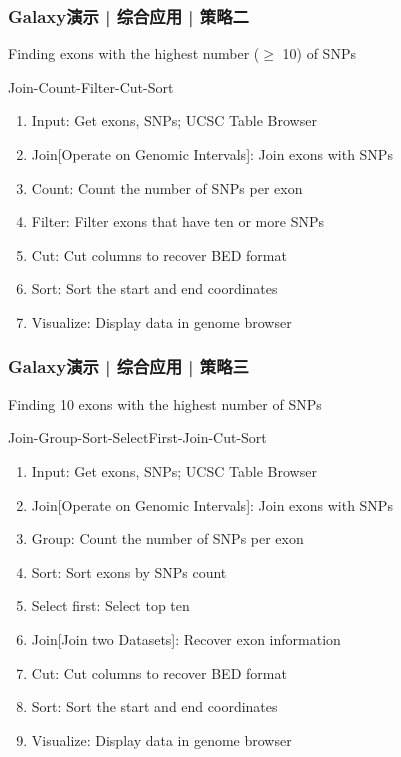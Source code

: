 \begin{frame}
  \frametitle{Galaxy演示 | \alert{综合应用} | 策略二}
  \begin{block}{Finding exons with the highest number ($\geq$ 10) of SNPs}
    \pause
    \begin{block}{Join-Count-Filter-Cut-Sort}
    \pause
  \begin{enumerate}[<+-|alert@+>]
    \item Input: Get exons, SNPs; UCSC Table Browser
    \item Join[Operate on Genomic Intervals]: Join exons with SNPs
    \item Count: Count the number of SNPs per exon 
    \item Filter: Filter exons that have ten or more SNPs
    \item Cut: Cut columns to recover BED format
    \item Sort: Sort the start and end coordinates
    \item Visualize: Display data in genome browser
  \end{enumerate}
\end{block}
  \end{block}
\end{frame}

\begin{frame}
  \frametitle{Galaxy演示 | \alert{综合应用} | 策略三}
  \begin{block}{Finding 10 exons with the highest number of SNPs}
    \pause
    \begin{block}{Join-Group-Sort-SelectFirst-Join-Cut-Sort}
    \pause
  \begin{enumerate}[<+-|alert@+>]
    \item Input: Get exons, SNPs; UCSC Table Browser
    \item Join[Operate on Genomic Intervals]: Join exons with SNPs
    \item Group: Count the number of SNPs per exon 
    \item Sort: Sort exons by SNPs count
    \item Select first: Select top ten
    \item Join[Join two Datasets]: Recover exon information
    \item Cut: Cut columns to recover BED format
    \item Sort: Sort the start and end coordinates
    \item Visualize: Display data in genome browser
  \end{enumerate}
\end{block}
  \end{block}
\end{frame}


